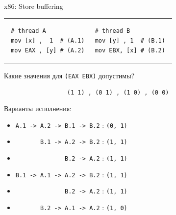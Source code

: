  \begin{frame}{x86: Store buffering}
 
 \begin{tabular}{p{} p{}}
 \begin{verbatim}
 # thread A
 mov [x] ,  1  # (A.1)
 mov EAX , [y] # (A.2)
 \end{verbatim}
 
 & 
 
 \begin{verbatim}
 # thread B          
 mov [y] , 1  # (B.1) 
 mov EBX, [x] # (B.2) 
 \end{verbatim}
 \end{tabular}
 
 Какие значения для \texttt{(EAX EBX)} допустимы?
 
 \texttt{\ \ \ \ \ \ \ \ \ \ \ \ \ \ \ \ \ \ (1 1)\ , (0 1)\ , (1 0)\ , (0 0)}
 
 Варианты исполнения:
 \begin{itemize}
     \item \texttt{A.1 -> A.2 -> B.1 -> B.2}                            : \texttt{(0, 1)}
     \item \texttt{\ \ \ \ \ \ \       B.1 -> A.2 -> B.2}               : \texttt{(1, 1)}
     \item \texttt{\ \ \ \ \ \ \ \ \ \ \ \ \ \              B.2 -> A.2} : \texttt{(1, 1)}
     \item \texttt{B.1 -> A.1 -> A.2 -> B.2}                            : \texttt{(1, 1)}
     \item \texttt{\ \ \ \ \ \ \ \ \ \ \ \ \ \              B.2 -> A.2} : \texttt{(1, 1)}
     \item \texttt{\ \ \ \ \ \ \       B.2 -> A.1 -> A.2}               : \texttt{(1, 0)}
 \end{itemize}
 \end{frame}
 
